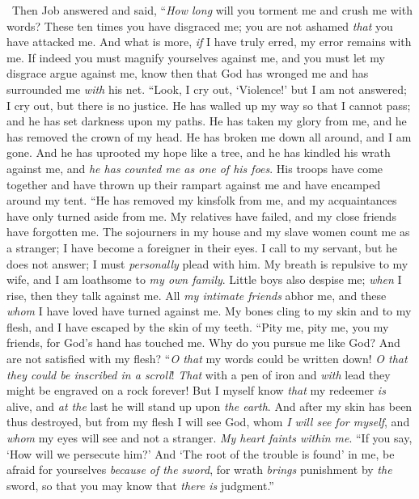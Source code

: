 \begin{biblechapter} %
  Then Job answered and said,
\verse “\textit{How long} will you torment me 
and crush me with words?
\verse These ten times you have disgraced me; 
you are not ashamed \textit{that} you have attacked me.
\verse And what is more, \textit{if} I have truly erred, 
my error remains with me.
\verse If indeed you must magnify yourselves against me, 
and you must let my disgrace argue against me,
\verse know then that God has wronged me 
and has surrounded me \textit{with} his net.
\verse “Look, I cry out, ‘Violence!’ but I am not answered; 
I cry out, but there is no justice.
\verse He has walled up my way so that I cannot pass; 
and he has set darkness upon my paths.
\verse He has taken my glory from me, 
and he has removed the crown of my head.
\verse He has broken me down all around, and I am gone. 
And he has uprooted my hope like a tree,
\verse and he has kindled his wrath against me, 
and \textit{he has counted me as one of his foes}.
\verse His troops have come together 
and have thrown up their rampart against me 
and have encamped around my tent.
\verse “He has removed my kinsfolk from me, 
and my acquaintances have only turned aside from me.
\verse My relatives have failed, 
and my close friends have forgotten me.
\verse The sojourners in my house and my slave women count me as a stranger; 
I have become a foreigner in their eyes.
\verse I call to my servant, but he does not answer; 
I must \textit{personally} plead with him.
\verse My breath is repulsive to my wife, 
and I am loathsome to \textit{my own family}.
\verse Little boys also despise me; 
\textit{when} I rise, then they talk against me.
\verse All \textit{my intimate friends} abhor me, 
and these \textit{whom} I have loved have turned against me.
\verse My bones cling to my skin and to my flesh, 
and I have escaped by the skin of my teeth.
\verse “Pity me, pity me, you my friends, 
for God’s hand has touched me.
\verse Why do you pursue me like God? 
And are not satisfied with my flesh?
\verse “\textit{O that} my words could be written down! 
\textit{O that they could be inscribed in a scroll}!
\verse \textit{That} with a pen of iron and \textit{with} lead 
they might be engraved on a rock forever!
\verse But I myself know \textit{that} my redeemer \textit{is} alive, 
and \textit{at the} last he will stand up upon \textit{the earth}.
\verse And after my skin has been thus destroyed, 
but from my flesh I will see God,
\verse whom \textit{I will see for myself}, 
and \textit{whom} my eyes will see and not a stranger. 
\textit{My heart faints within me}.
\verse “If you say, ‘How will we persecute him?’ 
And ‘The root of the trouble is found’ in me,
\verse be afraid for yourselves \textit{because of the sword}, 
for wrath \textit{brings} punishment by \textit{the} sword, 
so that you may know that \textit{there is} judgment.”
\end{biblechapter}

